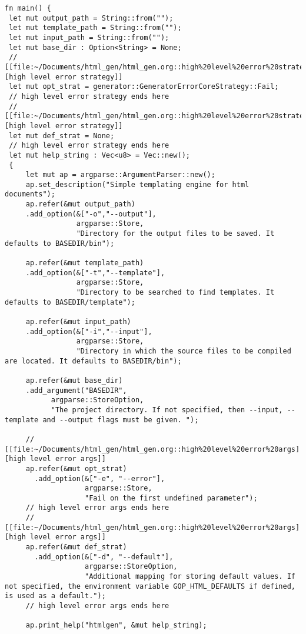 \documentclass[11pt]{article}
\begin{document}
\begin{verbatim}
fn main() {
 let mut output_path = String::from("");
 let mut template_path = String::from("");
 let mut input_path = String::from("");
 let mut base_dir : Option<String> = None;
 // [[file:~/Documents/html_gen/html_gen.org::high%20level%20error%20strategy][high level error strategy]]
 let mut opt_strat = generator::GeneratorErrorCoreStrategy::Fail;
 // high level error strategy ends here
 // [[file:~/Documents/html_gen/html_gen.org::high%20level%20error%20strategy][high level error strategy]]
 let mut def_strat = None;
 // high level error strategy ends here
 let mut help_string : Vec<u8> = Vec::new();
 {
     let mut ap = argparse::ArgumentParser::new();
     ap.set_description("Simple templating engine for html documents");
     ap.refer(&mut output_path)
     .add_option(&["-o","--output"], 
                 argparse::Store, 
                 "Directory for the output files to be saved. It defaults to BASEDIR/bin");

     ap.refer(&mut template_path)
     .add_option(&["-t","--template"], 
                 argparse::Store, 
                 "Directory to be searched to find templates. It defaults to BASEDIR/template");

     ap.refer(&mut input_path)
     .add_option(&["-i","--input"], 
                 argparse::Store, 
                 "Directory in which the source files to be compiled are located. It defaults to BASEDIR/bin");

     ap.refer(&mut base_dir)
     .add_argument("BASEDIR", 
           argparse::StoreOption, 
           "The project directory. If not specified, then --input, --template and --output flags must be given. ");

     // [[file:~/Documents/html_gen/html_gen.org::high%20level%20error%20args][high level error args]]
     ap.refer(&mut opt_strat)
       .add_option(&["-e", "--error"],
                   argparse::Store,
                   "Fail on the first undefined parameter");
     // high level error args ends here
     // [[file:~/Documents/html_gen/html_gen.org::high%20level%20error%20args][high level error args]]
     ap.refer(&mut def_strat)
       .add_option(&["-d", "--default"],
                   argparse::StoreOption,
                   "Additional mapping for storing default values. If not specified, the environment variable GOP_HTML_DEFAULTS if defined, is used as a default.");
     // high level error args ends here

     ap.print_help("htmlgen", &mut help_string);


\end{verbatim}
\end{document}
